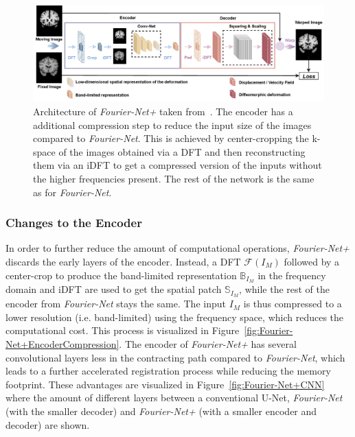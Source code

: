 \begin{figure}[h] %
	\centering
	\graphicspath{{images/}{\main/images/}}
	\includegraphics[width=\textwidth]{ArchitectureFourier-Net+.png} 
	\caption{Architecture of \emph{Fourier-Net+} taken from~\cite{Fourier-Net+}. The encoder has a additional compression step to reduce the input size of the images compared to \emph{Fourier-Net}. This is achieved by center-cropping the k-space of the images obtained via a DFT and then reconstructing them via an iDFT to get a compressed version of the inputs without the higher frequencies present. The rest of the network is the same as for \emph{Fourier-Net}.}
	\label{fig:Fourier-Net+}
\end{figure}

\subsubsection{Changes to the Encoder} \label{SubSubSec:ChangesEncoder}
In order to further reduce the amount of computational operations, \emph{Fourier-Net+} discards the early layers of the encoder. Instead, a DFT $\mathcal{F}(I_M)$ followed by a center-crop to produce the band-limited representation $\mathbb{B}_{I_M}$ in the frequency domain and iDFT are used to get the spatial patch $\mathbb{S}_{I_M}$, while the rest of the encoder from \emph{Fourier-Net} stays the same. The input $I_M$ is thus compressed to a lower resolution (i.e. band-limited) using the frequency space, which reduces the computational cost. This process is visualized in Figure~\ref{fig:Fourier-Net+EncoderCompression}. The encoder of \emph{Fourier-Net+} has several convolutional layers less in the contracting path compared to \emph{Fourier-Net}, which leads to a further accelerated registration process while reducing the memory footprint. These advantages are visualized in Figure~\ref{fig:Fourier-Net+CNN} where the amount of different layers between a conventional U-Net, \emph{Fourier-Net} (with the smaller decoder) and \emph{Fourier-Net+} (with a smaller encoder and decoder) are shown.

